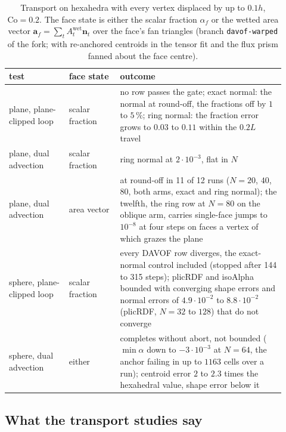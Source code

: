 \begin{table}[htbp]
\centering
\caption{Transport on hexahedra with every vertex displaced by up to $0.1h$, $\mathrm{Co} = 0.2$. The face state is either the scalar fraction $\alpha_f$ or the wetted area vector $\mathbf{a}_f = \sum_t A^{\mathrm{wet}}_t \mathbf{n}_t$ over the face's fan triangles (branch \texttt{davof-warped} of the fork; with re-anchored centroids in the tensor fit and the flux prism fanned about the face centre).}
\label{tab:tpf-perturbed}
\footnotesize
\begin{tabular}{p{0.2\linewidth}p{0.17\linewidth}p{0.55\linewidth}}
\toprule
test & face state & outcome \\
\midrule
plane, plane-clipped loop & scalar fraction & no row passes the gate; exact normal: the normal at round-off, the fractions off by $1$ to $5\,\%$; ring normal: the fraction error grows to $0.03$ to $0.11$ within the $0.2L$ travel \\
plane, dual advection & scalar fraction & ring normal at $2\cdot10^{-3}$, flat in $N$ \\
plane, dual advection & area vector & at round-off in 11 of 12 runs ($N = 20$, $40$, $80$, both arms, exact and ring normal); the twelfth, the ring row at $N = 80$ on the oblique arm, carries single-face jumps to $10^{-8}$ at four steps on faces a vertex of which grazes the plane \\
\midrule
sphere, plane-clipped loop & scalar fraction & every DAVOF row diverges, the exact-normal control included (stopped after 144 to 315 steps); plicRDF and isoAlpha bounded with converging shape errors and normal errors of $4.9\cdot10^{-2}$ to $8.8\cdot10^{-2}$ (plicRDF, $N = 32$ to $128$) that do not converge \\
sphere, dual advection & either & completes without abort, not bounded ($\min\alpha$ down to $-3\cdot10^{-3}$ at $N = 64$, the anchor failing in up to $1163$ cells over a run); centroid error $2$ to $2.3$ times the hexahedral value, shape error below it \\
\bottomrule
\end{tabular}
\end{table}

\subsection{What the transport studies say}
\label{sec:tpf-summary}

